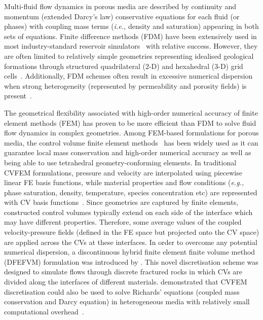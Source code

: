 \documentclass[preprint,authoryear,12pt]{elsarticle}
\newcommand{\eg}{{\it e.g., }}
\newcommand{\ie}{{\it i.e., }}
\begin{document}
\medskip 
Multi-fluid flow dynamics in porous media are described by continuity and momentum (extended Darcy's law) conservative equations for each fluid (or phases) with coupling mass terms (\ie density and saturation) appearing in both sets of equations. Finite difference methods (FDM) have been extensively used in most industry-standard reservoir simulators~\citep{aziz_1986, chen_2005, chang_1990} with relative success. However, they are often limited to relatively simple geometries representing idealised geological formations through structured quadrilateral (2-D) and hexahedral (3-D) grid cells~\citep{mlacnik_2004, king_1999}. Additionally, FDM schemes often result in excessive numerical dispersion when strong heterogeneity (represented by permeability and porosity fields) is present~\citep{chavent_1986}.

\medskip
The geometrical flexibility associated with high-order numerical accuracy of finite element methods (FEM) has proven to be more efficient than FDM to solve fluid flow dynamics in complex geometries. Among FEM-based formulations for porous media, the control volume finite element methods~\citep[CVFEM,][]{fung_1992} has been widely used as it can guarantee local mass conservation and high-order numerical accuracy as well as being able to use tetrahedral geometry-conforming elements. In traditional CVFEM formulations, pressure and velocity are interpolated using piecewise linear FE basis functions, while material properties and flow conditions (\eg phase saturation, density, temperature, species concentration etc) are represented with CV basis functions~\citep{voller_2009}. Since geometries are captured by finite elements, constructed control volumes typically extend on each side of the interface which may have different properties. Therefore, some average values of the coupled velocity-pressure fields (defined in the FE space but projected onto the CV space) are applied across the CVs at these interfaces. %
In order to overcome any potential numerical dispersion, a discontinuous hybrid finite element finite volume method (DFEFVM) formulation was introduced by \citet{nick_2011b, nick_2011a}. This novel discretisation scheme was designed to simulate flows through discrete fractured rocks in which CVs are divided along the interfaces of different materials. \citet{cumming_2011} demonstrated that CVFEM discretisation could also be used to solve Richards' equations (coupled mass conservation and Darcy equation) in heterogeneous media with relatively small computational overhead~\citep[compared with traditional coupled velocity-pressure based formulations, see also][]{cumming_phd2012}. 
\end{document}
